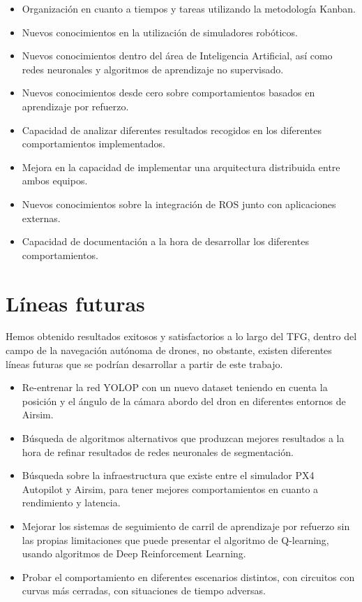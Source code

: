 \begin{itemize}
    \item Organización en cuanto a tiempos y tareas utilizando la metodología Kanban.
    \item Nuevos conocimientos en la utilización de simuladores robóticos.
    \item Nuevos conocimientos dentro del área de Inteligencia Artificial, así como redes neuronales y algoritmos de
    aprendizaje no supervisado. 
    \item Nuevos conocimientos desde cero sobre comportamientos basados en aprendizaje por refuerzo.
    \item Capacidad de analizar diferentes resultados recogidos en los diferentes comportamientos implementados.
    \item Mejora en la capacidad de implementar una arquitectura distribuida entre ambos equipos.
    \item Nuevos conocimientos sobre la integración de ROS junto con aplicaciones externas.
    \item Capacidad de documentación a la hora de desarrollar los diferentes comportamientos. 
\end{itemize}

\section{Líneas futuras}
\label{lineas_futuras}
Hemos obtenido resultados exitosos y satisfactorios a lo largo del TFG, dentro del campo de la navegación autónoma de drones, no obstante, existen diferentes líneas futuras que se
podrían desarrollar a partir de este trabajo.

\begin{itemize}
\item Re-entrenar la red YOLOP con un nuevo dataset teniendo en cuenta la posición y el ángulo de la cámara abordo del dron en diferentes entornos de Airsim.
\item Búsqueda de algoritmos alternativos que produzcan mejores resultados a la hora de refinar resultados de redes neuronales de segmentación.
\item Búsqueda sobre la infraestructura que existe entre el simulador PX4 Autopilot y Airsim, para tener mejores
comportamientos en cuanto a rendimiento y latencia.
\item Mejorar los sistemas de seguimiento de carril de aprendizaje por refuerzo sin las propias limitaciones que puede
presentar el algoritmo de Q-learning, usando algoritmos de Deep Reinforcement Learning.
\item Probar el comportamiento en diferentes escenarios distintos, con circuitos con curvas más cerradas, con situaciones de tiempo
adversas. 
\end{itemize}